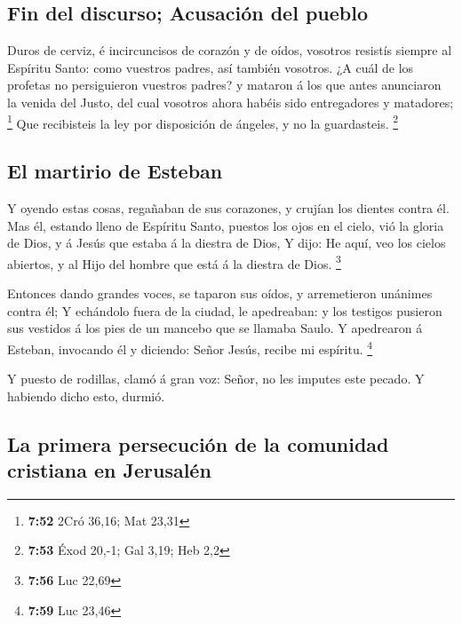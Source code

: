 \hypertarget{fin-del-discurso-acusaciuxf3n-del-pueblo}{%
\subsection{Fin del discurso; Acusación del
pueblo}\label{fin-del-discurso-acusaciuxf3n-del-pueblo}}

 Duros de cerviz, é incircuncisos de corazón y de oídos,
vosotros resistís siempre al Espíritu Santo: como vuestros padres, así
también vosotros.  ¿A cuál de los profetas no persiguieron
vuestros padres? y mataron á los que antes anunciaron la venida del
Justo, del cual vosotros ahora habéis sido entregadores y matadores;
\footnote{\textbf{7:52} 2Cró 36,16; Mat 23,31}  Que
recibisteis la ley por disposición de ángeles, y no la guardasteis.
\footnote{\textbf{7:53} Éxod 20,-1; Gal 3,19; Heb 2,2}

\hypertarget{el-martirio-de-esteban}{%
\subsection{El martirio de Esteban}\label{el-martirio-de-esteban}}

 Y oyendo estas cosas, regañaban de sus corazones, y
crujían los dientes contra él.  Mas él, estando lleno de
Espíritu Santo, puestos los ojos en el cielo, vió la gloria de Dios, y á
Jesús que estaba á la diestra de Dios,  Y dijo: He aquí,
veo los cielos abiertos, y al Hijo del hombre que está á la diestra de
Dios. \footnote{\textbf{7:56} Luc 22,69}

 Entonces dando grandes voces, se taparon sus oídos, y
arremetieron unánimes contra él;  Y echándolo fuera de la
ciudad, le apedreaban: y los testigos pusieron sus vestidos á los pies
de un mancebo que se llamaba Saulo.  Y apedrearon á
Esteban, invocando él y diciendo: Señor Jesús, recibe mi espíritu.
\footnote{\textbf{7:59} Luc 23,46}

 Y puesto de rodillas, clamó á gran voz: Señor, no les
imputes este pecado. Y habiendo dicho esto, durmió.

\hypertarget{la-primera-persecuciuxf3n-de-la-comunidad-cristiana-en-jerusaluxe9n}{%
\subsection{La primera persecución de la comunidad cristiana en
Jerusalén}\label{la-primera-persecuciuxf3n-de-la-comunidad-cristiana-en-jerusaluxe9n}}

